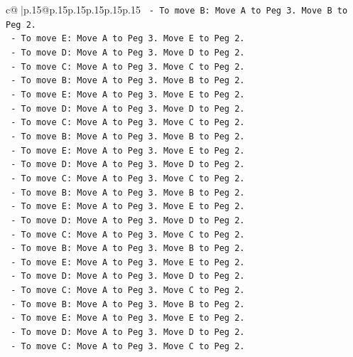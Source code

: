 \documentclass{article}
\begin{document}
{\begin{supertabular}{c@{$\;$}|p{.15\linewidth}@{}p{.15\linewidth}p{.15\linewidth}p{.15\linewidth}p{.15\linewidth}p{.15\linewidth}}
{{{\texttt{        {-}   To move B: Move A to Peg 3. Move B to Peg 2.} \\
\texttt{        {-}   To move E: Move A to Peg 3. Move E to Peg 2.} \\
\texttt{        {-}   To move D: Move A to Peg 3. Move D to Peg 2.} \\
\texttt{        {-}   To move C: Move A to Peg 3. Move C to Peg 2.} \\
\texttt{        {-}   To move B: Move A to Peg 3. Move B to Peg 2.} \\
\texttt{        {-}   To move E: Move A to Peg 3. Move E to Peg 2.} \\
\texttt{        {-}   To move D: Move A to Peg 3. Move D to Peg 2.} \\
\texttt{        {-}   To move C: Move A to Peg 3. Move C to Peg 2.} \\
\texttt{        {-}   To move B: Move A to Peg 3. Move B to Peg 2.} \\
\texttt{        {-}   To move E: Move A to Peg 3. Move E to Peg 2.} \\
\texttt{        {-}   To move D: Move A to Peg 3. Move D to Peg 2.} \\
\texttt{        {-}   To move C: Move A to Peg 3. Move C to Peg 2.} \\
\texttt{        {-}   To move B: Move A to Peg 3. Move B to Peg 2.} \\
\texttt{        {-}   To move E: Move A to Peg 3. Move E to Peg 2.} \\
\texttt{        {-}   To move D: Move A to Peg 3. Move D to Peg 2.} \\
\texttt{        {-}   To move C: Move A to Peg 3. Move C to Peg 2.} \\
\texttt{        {-}   To move B: Move A to Peg 3. Move B to Peg 2.} \\
\texttt{        {-}   To move E: Move A to Peg 3. Move E to Peg 2.} \\
\texttt{        {-}   To move D: Move A to Peg 3. Move D to Peg 2.} \\
\texttt{        {-}   To move C: Move A to Peg 3. Move C to Peg 2.} \\
\texttt{        {-}   To move B: Move A to Peg 3. Move B to Peg 2.} \\
\texttt{        {-}   To move E: Move A to Peg 3. Move E to Peg 2.} \\
\texttt{        {-}   To move D: Move A to Peg 3. Move D to Peg 2.} \\
\texttt{        {-}   To move C: Move A to Peg 3. Move C to Peg 2.} \\
}}}
\end{supertabular}}
\end{document}
